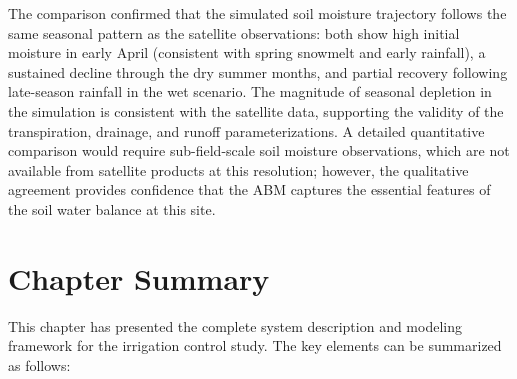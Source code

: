 The comparison confirmed that the simulated soil moisture trajectory follows the same seasonal pattern as the satellite observations: both show high initial moisture in early April (consistent with spring snowmelt and early rainfall), a sustained decline through the dry summer months, and partial recovery following late-season rainfall in the wet scenario. The magnitude of seasonal depletion in the simulation is consistent with the satellite data, supporting the validity of the transpiration, drainage, and runoff parameterizations. A detailed quantitative comparison would require sub-field-scale soil moisture observations, which are not available from satellite products at this resolution; however, the qualitative agreement provides confidence that the ABM captures the essential features of the soil water balance at this site.


\section{Chapter Summary}
\label{sec:ch3_summary}

This chapter has presented the complete system description and modeling framework for the irrigation control study. The key elements can be summarized as follows:

